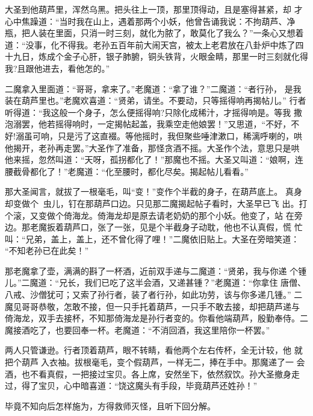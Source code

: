 大圣到他葫芦里，浑然乌黑。把头往上一顶，那里顶得动，且是塞得甚紧，却
才心中焦躁道：“当时我在山上，遇着那两个小妖，他曾告诵我说：不拘葫芦、净
瓶，把人装在里面，只消一时三刻，就化为脓了，敢莫化了我么？”一条心又想着
道：“没事，化不得我。老孙五百年前大闹天宫，被太上老君放在八卦炉中炼了四
十九日，炼成个金子心肝，银子肺腑，铜头铁背，火眼金睛，那里一时三刻就化得
我?且跟他进去，看他怎的。”

二魔拿入里面道：“哥哥，拿来了。”老魔道：“拿了谁？”二魔道：“者行孙，
是我装在葫芦里也。”老魔欢喜道：“贤弟，请坐。不要动，只等摇得响再揭帖儿。”
行者听得道：“我这般一个身子，怎么便摇得响?只除化成稀汁，才摇得响是。等我
撒泡溺罢，他若摇得响时，一定揭帖起盖，我乘空走他娘罢！”又思道，“不好，不
好!溺虽可响，只是污了这直裰。等他摇时，我但聚些唾津漱口，稀漓呼喇的，哄
他揭开，老孙再走罢。”大圣作了准备，那怪贪酒不摇。大圣作个法，意思只是哄
他来摇，忽然叫道：“天呀，孤拐都化了！”那魔也不摇。大圣又叫道：“娘啊，连
腰截骨都化了！”老魔道：“化至腰时，都化尽矣。揭起帖儿看看。”

那大圣闻言，就拔了一根毫毛，叫“变！”变作个半截的身子，在葫芦底上。
真身却变做个虫儿，钉在那葫芦口边。只见那二魔揭起帖子看时，大圣早已飞
出。打个滚，又变做个倚海龙。倚海龙却是原去请老奶奶的那个小妖。他变了，站
在旁边。那老魔扳着葫芦口，张了一张，见是个半截身子动耽，他也不认真假，慌
忙叫：“兄弟，盖上，盖上，还不曾化得了哩！”二魔依旧贴上。大圣在旁暗笑道：
“不知老孙已在此矣！”

那老魔拿了壶，满满的斟了一杯酒，近前双手递与二魔道：“贤弟，我与你递
个锺儿。”二魔道：“兄长，我们已吃了这半会酒，又递甚锺？”老魔道：“你拿住
唐僧、八戒、沙僧犹可；又索了孙行者，装了者行孙，如此功劳，该与你多递几锺。”
二魔见哥哥恭敬，怎敢不接，但一只手托着葫芦，一只手不敢去接，却把葫芦递与
倚海龙，双手去接杯，不知那倚海龙是孙行者变的。你看他端葫芦，殷勤奉侍。二
魔接酒吃了，也要回奉一杯。老魔道：“不消回酒，我这里陪你一杯罢。”

两人只管谦逊。行者顶着葫芦，眼不转睛，看他两个左右传杯，全无计较，他
就把个葫芦入衣袖。拔根毫毛，变个假葫芦，一样无二，捧在手中。那魔递了一
会酒，也不看真假，一把接过宝贝。各上席，安然坐下，依然叙饮。孙大圣撤身走
过，得了宝贝，心中暗喜道：“饶这魔头有手段，毕竟葫芦还姓孙！”

毕竟不知向后怎样施为，方得救师灭怪，且听下回分解。